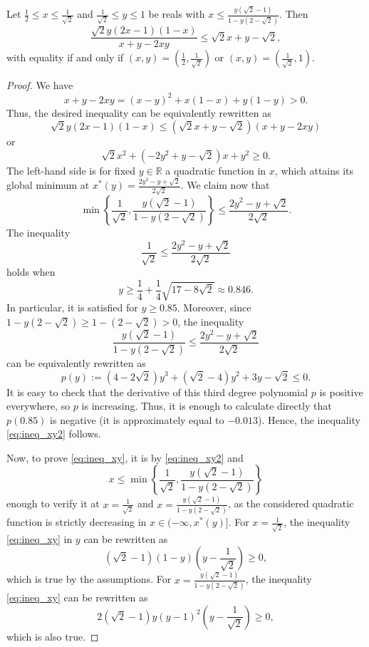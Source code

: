 \documentclass[10pt,a4paper]{amsart}
\newcommand\R{\mathbb{R}}
\begin{document}
\begin{lem}
\label{lem:stab_ineq}
Let $\frac{1}{2} \leq x \leq \frac{1}{\sqrt{2}}$ and $\frac{1}{\sqrt{2}} \leq y \leq 1$ be reals with $x \leq \frac{y(\sqrt{2}-1)}{1-y(2-\sqrt{2})}$. Then
$$\frac{\sqrt{2}y(2x-1)(1-x)}{x + y - 2xy} \leq \sqrt{2} x + y - \sqrt{2},$$
with equality if and only if $(x,y) = \left( \frac{1}{2}, \frac{1}{\sqrt{2}} \right)$ or $(x,y) = \left( \frac{1}{\sqrt{2}},1 \right)$.
\end{lem}

\begin{proof}
We have
$$ x + y -2xy = (x-y)^2 + x (1-x) + y (1-y) > 0. $$
Thus, the desired inequality can be equivalently rewritten as
$$\sqrt{2}y(2x-1)(1-x) \leq (\sqrt{2} x + y - \sqrt{2})(x+y-2xy)$$
or
\begin{equation}
\label{eq:ineq_xy}
\sqrt{2}x^2 + (-2y^2 + y - \sqrt{2})x + y^2 \geq 0.
\end{equation}
The left-hand side is for fixed $y \in \R$ a quadratic function in $x$, which attains its global minimum at $x^*(y) = \frac{2y^2-y+\sqrt{2}}{2\sqrt{2}}$. We claim now that
\begin{equation}
\label{eq:ineq_xy2}
\min \left\{ \frac{1}{\sqrt{2}}, \frac{y(\sqrt{2}-1)}{1-y(2-\sqrt{2})} \right\} \leq \frac{2y^2-y+\sqrt{2}}{2\sqrt{2}}.
\end{equation}
The inequality 
$$ \frac{1}{\sqrt{2}} \leq \frac{2y^2-y+\sqrt{2}}{2\sqrt{2}} $$
holds when
$$y \geq \frac{1}{4} + \frac{1}{4} \sqrt{17 - 8 \sqrt{2}} \approx 0.846.$$
In particular, it is satisfied for $y \geq 0.85$. Moreover, since $1-y(2-\sqrt{2}) \geq 1 - (2-\sqrt{2}) > 0$, the inequality
$$ \frac{y(\sqrt{2}-1)}{1-y(2-\sqrt{2})} \leq \frac{2y^2-y+\sqrt{2}}{2\sqrt{2}} $$
can be equivalently rewritten as
$$ p(y) := (4-2\sqrt{2}) y^3 +  (\sqrt{2}-4) y^2 + 3y - \sqrt{2} \leq 0. $$
It is easy to check that the derivative of this third degree polynomial $p$ is positive everywhere, so $p$ is increasing. Thus, it is enough to calculate directly that $p(0.85)$ is negative (it is approximately equal to $-0.013$). Hence, the inequality \eqref{eq:ineq_xy2} follows.

Now, to prove \eqref{eq:ineq_xy}, it is by \eqref{eq:ineq_xy2} and
$$x \leq \min \left\{ \frac{1}{\sqrt{2}}, \frac{y(\sqrt{2}-1)}{1-y(2-\sqrt{2})} \right\}$$
enough to verify it at $x = \frac{1}{\sqrt{2}}$ and $x=\frac{y(\sqrt{2}-1)}{1-y(2-\sqrt{2})}$, as the considered quadratic function is strictly decreasing in $x\in (-\infty,x^*(y)]$. For $x = \frac{1}{\sqrt{2}}$, the inequality \eqref{eq:ineq_xy} in $y$ can be rewritten as
$$(\sqrt{2}-1)(1-y)\left ( y - \frac{1}{\sqrt{2}} \right ) \geq 0,$$
which is true by the assumptions. For $x = \frac{y(\sqrt{2}-1)}{1-y(2-\sqrt{2})}$, the inequality \eqref{eq:ineq_xy} can be rewritten as
$$ 2 (\sqrt{2}-1)y(y-1)^2 \left( y-\frac{1}{\sqrt{2}} \right) \geq 0, $$
which is also true.


\end{proof}
\end{document}
